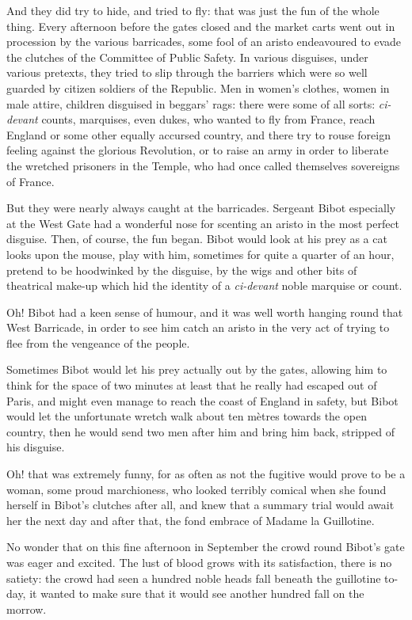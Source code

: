 And they did try to hide, and tried to fly: that was just the fun of the whole thing. Every afternoon before the gates closed and the market carts went out in procession by the various barricades, some fool of an aristo endeavoured to evade the clutches of the Committee of Public Safety. In various disguises, under various pretexts, they tried to slip through the barriers which were so well guarded by citizen soldiers of the Republic. Men in women's clothes, women in male attire, children disguised in beggars' rags: there were some of all sorts: \textit{ci-devant} counts, marquises, even dukes, who wanted to fly from France, reach England or some other equally accursed country, and there try to rouse foreign feeling against the glorious Revolution, or to raise an army in order to liberate the wretched prisoners in the Temple, who had once called themselves sovereigns of France.

But they were nearly always caught at the barricades. Sergeant Bibot especially at the West Gate had a wonderful nose for scenting an aristo in the most perfect disguise. Then, of course, the fun began. Bibot would look at his prey as a cat looks upon the mouse, play with him, sometimes for quite a quarter of an hour, pretend to be hoodwinked by the disguise, by the wigs and other bits of theatrical make-up which hid the identity of a \textit{ci-devant} noble marquise or count.

Oh! Bibot had a keen sense of humour, and it was well worth hanging round that West Barricade, in order to see him catch an aristo in the very act of trying to flee from the vengeance of the people.

Sometimes Bibot would let his prey actually out by the gates, allowing him to think for the space of two minutes at least that he really had escaped out of Paris, and might even manage to reach the coast of England in safety, but Bibot would let the unfortunate wretch walk about ten mètres towards the open country, then he would send two men after him and bring him back, stripped of his disguise.

Oh! that was extremely funny, for as often as not the fugitive would prove to be a woman, some proud marchioness, who looked terribly comical when she found herself in Bibot's clutches after all, and knew that a summary trial would await her the next day and after that, the fond embrace of Ma\-dame la Guillotine.

No wonder that on this fine afternoon in September the crowd round Bibot's gate was eager and excited. The lust of blood grows with its satisfaction, there is no satiety: the crowd had seen a hundred noble heads fall beneath the guillotine to-day, it wanted to make sure that it would see another hundred fall on the morrow.

